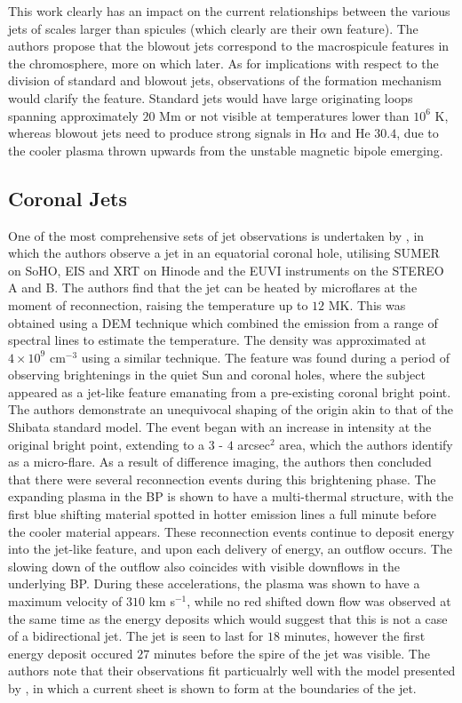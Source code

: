 This work clearly has an impact on the current relationships between the various jets of scales larger than spicules (which clearly are their own feature).
The authors propose that the blowout jets correspond to the macrospicule features in the chromosphere, more on which later.
As for implications with respect to the division of standard and blowout jets, observations of the formation mechanism would clarify the feature.
Standard jets would have large originating loops spanning approximately $20$ Mm or not visible at temperatures lower than $10^6$ K, whereas blowout jets need to produce strong signals in H$\alpha$ and He $30.4$, due to the cooler plasma thrown upwards from the unstable magnetic bipole emerging.

\subsection{Coronal Jets}
One of the most comprehensive sets of jet observations is undertaken by \cite{Majarska2011}, in which the authors observe a jet in an equatorial coronal hole, utilising SUMER on SoHO, EIS and XRT on Hinode and the EUVI instruments on the STEREO A and B.
The authors find that the jet can be heated by microflares at the moment of reconnection, raising the temperature up to $12$ MK.
This was obtained using a DEM technique which combined the emission from a range of spectral lines to estimate the temperature.
The density was approximated at $4 \times 10^9$ cm$^{-3}$ using a similar technique.
The feature was found during a period of observing brightenings in the quiet Sun and coronal holes, where the subject appeared as a jet-like feature emanating from a pre-existing coronal bright point.
The authors demonstrate an unequivocal shaping of the origin akin to that of the Shibata standard model.
The event began with an increase in intensity at the original bright point, extending to a $3$ - $4$ arcsec$^2$ area, which the authors identify as a micro-flare.
As a result of difference imaging, the authors then concluded that there were several reconnection events during this brightening phase.
The expanding plasma in the BP is shown to have a multi-thermal structure, with the first blue shifting material spotted in hotter emission lines a full minute before the cooler material appears.
These reconnection events continue to deposit energy into the jet-like feature, and upon each delivery of energy, an outflow occurs.
The slowing down of the outflow also coincides with visible downflows in the underlying BP.
During these accelerations, the plasma was shown to have a maximum velocity of $310$ km s$^{-1}$, while no red shifted down flow was observed at the same time as the energy deposits which would suggest that this is not a case of a bidirectional jet.
The jet is seen to last for $18$ minutes, however the first energy deposit occured $27$ minutes before the spire of the jet was visible.
The authors note that their observations fit particualrly well with the model presented by \cite{Moreno2008}, in which a current sheet is shown to form at the boundaries of the jet.


